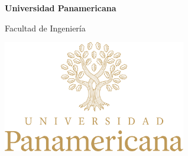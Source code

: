 \begin{center} \vfill
\thispagestyle{empty}
\textbf{\Large Universidad Panamericana}

{\large Facultad de Ingeniería  \vfill

\Coursecode

\Semester} \vfill

\includegraphics[width=80mm]{pics/UP_logo.png} \vfill

\emph{\Large \thetitle} \vfill

{\large \theauthor} \vfill

\end{center} \clearpage
